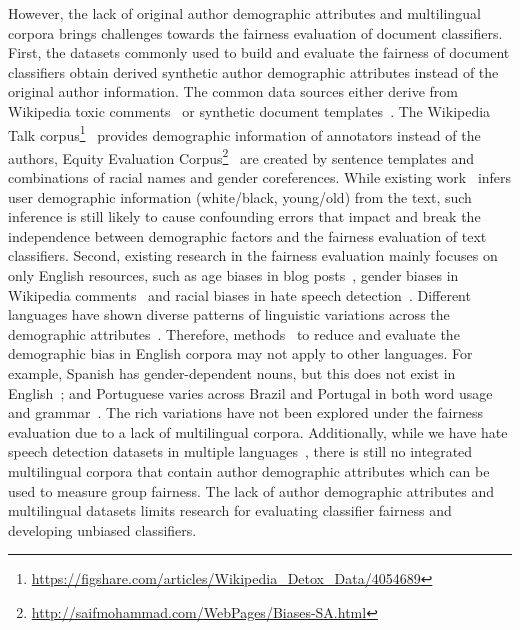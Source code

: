 However, the lack of original author demographic attributes and multilingual corpora brings challenges towards the fairness evaluation of document classifiers.
First, the datasets commonly used to build and evaluate the fairness of document classifiers obtain derived synthetic author demographic attributes instead of the original author information.
The common data sources either derive from Wikipedia toxic comments~\cite{dixon2018measuring, park2018reducing, garg2019counterfactual} or synthetic document templates~\cite{kiritchenko2018examining, park2018reducing}.
The Wikipedia Talk corpus\footnote{\url{https://figshare.com/articles/Wikipedia_Detox_Data/4054689}}~\cite{wulczyn2017ex} provides demographic information of annotators instead of the authors, Equity Evaluation Corpus\footnote{\url{http://saifmohammad.com/WebPages/Biases-SA.html}}~\cite{kiritchenko2018examining} are created by sentence templates and combinations of racial names and gender coreferences.
While existing work~\cite{davidson2019racial, diaz2018addressing} infers user demographic information (white/black, young/old) from the text, such inference is still likely to cause confounding errors that impact and break the independence between demographic factors and the fairness evaluation of text classifiers.
Second, existing research in the fairness evaluation mainly focuses on only English resources, such as age biases in blog posts~\cite{diaz2018addressing}, gender biases in Wikipedia comments~\cite{dixon2018measuring} and racial biases in hate speech detection~\cite{davidson2019racial}.
Different languages have shown diverse patterns of linguistic variations across the demographic attributes~\cite{johannsen2015cross, huang2019neural}.
Therefore, methods~\cite{zhao2017men, park2018reducing} to reduce and evaluate the demographic bias in English corpora may not apply to other languages. 
For example, Spanish has gender-dependent nouns, but this does not exist in English~\cite{sun2019mitigating}; and Portuguese varies across Brazil and Portugal in both word usage and grammar~\cite{maier2014language}.
The rich variations have not been explored under the fairness evaluation due to a lack of multilingual corpora.
Additionally, while we have hate speech detection datasets in multiple languages~\cite{waseem2016hateful, sanguinetti2018italian, ptaszynski2017learning, basile2019semeval, fortuna2019hierarchically}, there is still no integrated multilingual corpora that contain author demographic attributes which can be used to measure group fairness.
The lack of author demographic attributes and multilingual datasets limits research for evaluating classifier fairness and developing unbiased classifiers.


